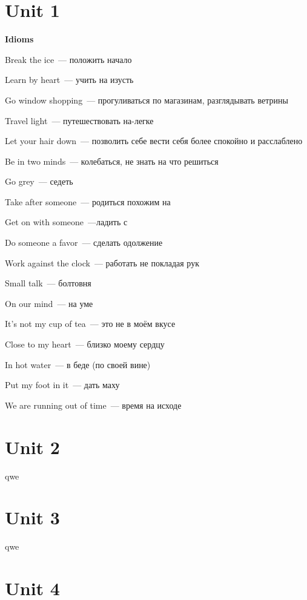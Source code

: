 \documentclass[10pt,a4paper]{article}
\begin{document}
\section{Unit 1}
\textbf{Idioms}

\noindent
Break the ice~--- положить начало

\noindent
Learn by heart~--- учить на изусть

\noindent
Go window shopping~--- прогуливаться по магазинам, разглядывать ветрины

\noindent
Travel light~--- путешествовать на-легке

\noindent
Let your hair down~--- позволить себе вести себя более спокойно и расслаблено

\noindent
Be in two minds~--- колебаться, не знать на что решиться

\noindent
Go grey~--- седеть

\noindent
Take after someone~--- родиться похожим на

\noindent
Get on with someone~---ладить с 

\noindent
Do someone a favor~--- сделать одолжение

\noindent
Work against the clock~--- работать не покладая рук

\noindent
Small talk~--- болтовня

\noindent
On our mind~--- на уме

\noindent
It's not my cup of tea~--- это не в моём вкусе

\noindent
Close to my heart~--- близко моему сердцу

\noindent
In hot water~--- в беде (по своей вине)

\noindent
Put my foot in it~--- дать маху

\noindent
We are running out of time~--- время на исходе



\section{Unit 2}
qwe



\section{Unit 3}
qwe



\section{Unit 4}
\end{document}
